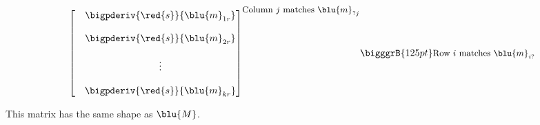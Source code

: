 \begin{definition}
\begin{equation*}
{\begin{bmatrix}
                        &
                        \begin{matrix}
                            \bigpderiv{ \red{s} } { \blu{m}_{1r} }\\ 
                            \\
                            \bigpderiv{ \red{s} } { \blu{m}_{2r} }\\ 
                            \\
                            \vdots \\ 
                            \\
                            \bigpderiv{ \red{s} } { \blu{m}_{kr} }
                        \end{matrix}
                    \end{bmatrix}
                }^{ \text{\small Column $j$ matches $\blu{m}_{?j}$} }
                \bigggrB{125pt} \text{\small Row $i$ matches $\blu{m}_{i?}$} 
            \end{equation*}
            
            This matrix has the same shape as $\blu{M}$.
        \end{definition}
        
        